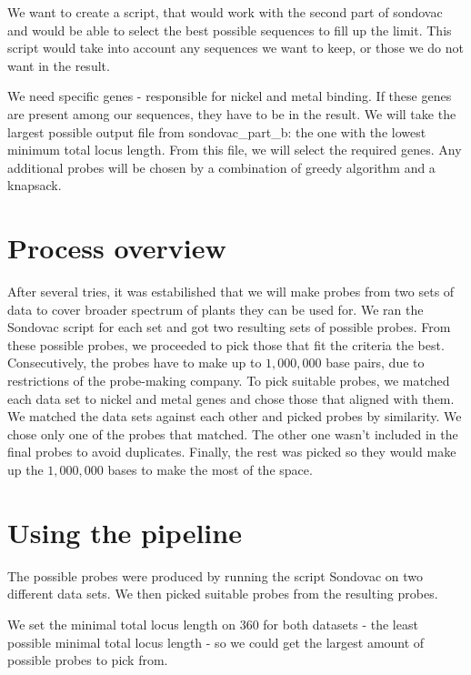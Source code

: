 We want to create a script, that would work with the second part of sondovac and would be able to select the best possible 
sequences to fill up the limit. This script would take into account any sequences we want to keep, or those we do not want in 
the result. 

We need specific genes - responsible for nickel and metal binding. If these genes are present among our sequences, they have 
to be in the result. We will take the largest possible output file from sondovac\_part\_b: the one with the lowest minimum total locus length. 
From this file, we will select the required genes. Any additional probes will be chosen by a combination of greedy algorithm and a knapsack. 


\section{Process overview}
After several tries, it was estabilished that we will make probes from two sets of data to cover broader spectrum of plants they can 
be used for. We ran the Sondovac script for each set and got two resulting sets of possible probes. From these possible probes, we 
proceeded to pick those that fit the criteria the best. Consecutively, the probes have to make up to $1,000,000$ base pairs, due to 
restrictions of the probe-making company. 
To pick suitable probes, we matched each data set to nickel and metal genes and chose those that aligned with them. We matched the 
data sets against each other and picked probes by similarity. We chose only one of the probes that matched. The other one 
wasn't included in the final probes to avoid duplicates. Finally, the rest was picked so they would make up the $1,000,000$ bases to 
make the most of the space. 


\section{Using the pipeline}
The possible probes were produced by running the script Sondovac on two different data sets. We then picked suitable probes from 
the resulting probes. 

We set the minimal total locus length on $360$ for both datasets - the least possible minimal total locus length - so we could get 
the largest amount of possible probes to pick from. 



